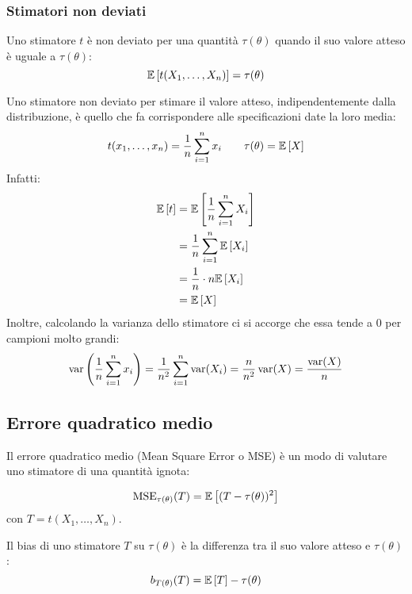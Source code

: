\subsubsection{Stimatori non deviati}
\begin{defin}
	Uno stimatore $t$ è non deviato per una quantità $\tau(\theta)$ quando il suo valore atteso è uguale a $\tau(\theta)$:
	\begin{equation*}
		\mathbb{E}\left[ t(X_1,\dots,X_n) \right] = \tau(\theta)
	\end{equation*}
\end{defin}

\begin{examp}
	Uno stimatore non deviato per stimare il valore atteso, indipendentemente dalla distribuzione, è quello che fa corrispondere alle specificazioni date la loro media:
	\begin{equation*}
		t(x_1,\dots,x_n) = \frac{1}{n} \sum_{i=1}^n x_i \qquad \tau(\theta) = \mathbb{E}\left[ X \right]
	\end{equation*}
	Infatti:
	\begin{align*}
		\mathbb{E}\left[ t \right] & = \mathbb{E}\left[ \frac{1}{n} \sum_{i=1}^n X_i \right] \\
		       & = \frac{1}{n}\sum_{i=1}^n \mathbb{E}\left[ X_i \right]  \\
		       & = \frac{1}{n} \cdot n\mathbb{E}\left[ X_i \right]       \\
		       & = \mathbb{E}\left[ X \right]
	\end{align*}
	Inoltre, calcolando la varianza dello stimatore ci si accorge che essa tende a 0 per campioni molto grandi:
	\begin{equation*}
		\operatorname{var}\left(\frac{1}{n} \sum_{i=1}^n x_i\right) = \frac{1}{n^2} \sum_{i=1}^n \operatorname{var}(X_i) = \frac{n}{n^2}\operatorname{var}(X) = \frac{\operatorname{var}(X)}{n}
	\end{equation*}
\end{examp}


\subsection{Errore quadratico medio}
Il errore quadratico medio (Mean Square Error o MSE) è un modo di valutare uno stimatore di una quantità ignota:
\begin{defin}
	\begin{equation*}
		\operatorname{MSE}_{\tau(\theta)}(T) = \mathbb{E}\left[ (T-\tau(\theta))^2 \right]
	\end{equation*}
	con $T=t(X_1,\dots,X_n)$.
\end{defin}

\begin{defin}
	Il bias di uno stimatore $T$ su $\tau(\theta)$ è la differenza tra il suo valore atteso e $\tau(\theta)$:
	\begin{equation*}
		b_{T(\theta)}(T) = \mathbb{E}\left[ T \right] - \tau(\theta)
	\end{equation*}
\end{defin}

